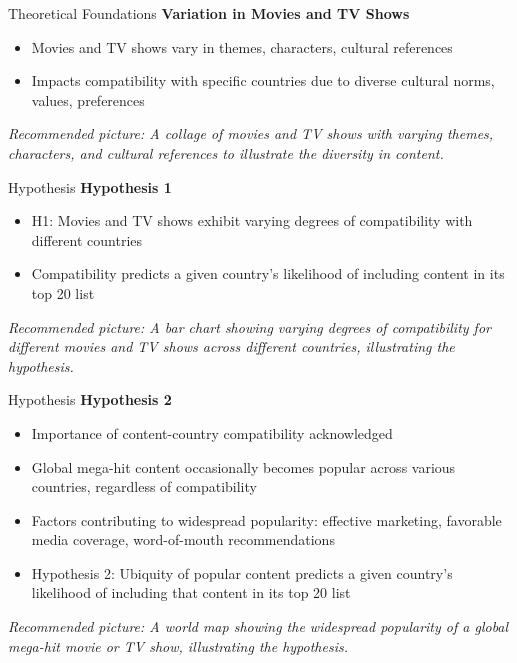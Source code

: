 \documentclass[
  ignorenonframetext,
]{beamer}
\begin{document}
\begin{frame}{Theoretical Foundations}
\protect\hypertarget{theoretical-foundations-11}{}
\textbf{Variation in Movies and TV Shows}

\begin{itemize}
\item
  Movies and TV shows vary in themes, characters, cultural references
\item
  Impacts compatibility with specific countries due to diverse cultural
  norms, values, preferences
\end{itemize}

\emph{Recommended picture: A collage of movies and TV shows with varying
themes, characters, and cultural references to illustrate the diversity
in content.}
\end{frame}

\begin{frame}{Hypothesis}
\protect\hypertarget{hypothesis}{}
\textbf{Hypothesis 1}

\begin{itemize}
\item
  H1: Movies and TV shows exhibit varying degrees of compatibility with
  different countries
\item
  Compatibility predicts a given country's likelihood of including
  content in its top 20 list
\end{itemize}

\emph{Recommended picture: A bar chart showing varying degrees of
compatibility for different movies and TV shows across different
countries, illustrating the hypothesis.}
\end{frame}

\begin{frame}{Hypothesis}
\protect\hypertarget{hypothesis-1}{}
\textbf{Hypothesis 2}

\begin{itemize}
\item
  Importance of content-country compatibility acknowledged
\item
  Global mega-hit content occasionally becomes popular across various
  countries, regardless of compatibility
\item
  Factors contributing to widespread popularity: effective marketing,
  favorable media coverage, word-of-mouth recommendations
\item
  Hypothesis 2: Ubiquity of popular content predicts a given country's
  likelihood of including that content in its top 20 list
\end{itemize}

\emph{Recommended picture: A world map showing the widespread popularity
of a global mega-hit movie or TV show, illustrating the hypothesis.}
\end{frame}
\end{document}
